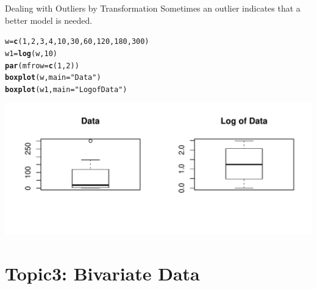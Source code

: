 \documentclass[t,xcolor=pdftex,dvipsnames,table]{beamer}\usepackage[]{graphicx}\usepackage[]{color}
\makeatletter
\def\maxwidth{ %
  \ifdim\Gin@nat@width>\linewidth
    \linewidth
  \else
    \Gin@nat@width
  \fi
}
\newcommand{\hlnum}[1]{\textcolor[rgb]{0.686,0.059,0.569}{#1}}%
\newcommand{\hlstr}[1]{\textcolor[rgb]{0.192,0.494,0.8}{#1}}%
\newcommand{\hlstd}[1]{\textcolor[rgb]{0.345,0.345,0.345}{#1}}%
\newcommand{\hlkwb}[1]{\textcolor[rgb]{0.69,0.353,0.396}{#1}}%
\newcommand{\hlkwc}[1]{\textcolor[rgb]{0.333,0.667,0.333}{#1}}%
\newcommand{\hlkwd}[1]{\textcolor[rgb]{0.737,0.353,0.396}{\textbf{#1}}}%
\newenvironment{kframe}{%
 \def\at@end@of@kframe{}%
 \ifinner\ifhmode%
  \def\at@end@of@kframe{\end{minipage}}%
  \begin{minipage}{\columnwidth}%
 \fi\fi%
 \def\FrameCommand##1{\hskip\@totalleftmargin \hskip-\fboxsep
 \colorbox{shadecolor}{##1}\hskip-\fboxsep
     \hskip-\linewidth \hskip-\@totalleftmargin \hskip\columnwidth}%
 \MakeFramed {\advance\hsize-\width
   \@totalleftmargin\z@ \linewidth\hsize
   \@setminipage}}%
 {\par\unskip\endMakeFramed%
 \at@end@of@kframe}
\newenvironment{knitrout}{}{} %
\makeatother
\begin{document}
\begin{frame}[fragile]{Dealing with Outliers by Transformation}
Sometimes an outlier indicates that a better model is needed.
\begin{knitrout}
\color{fgcolor}\begin{kframe}
\begin{alltt}
\hlstd{w}\hlkwb{=}\hlkwd{c}\hlstd{(}\hlnum{1}\hlstd{,}\hlnum{2}\hlstd{,}\hlnum{3}\hlstd{,}\hlnum{4}\hlstd{,}\hlnum{10}\hlstd{,}\hlnum{30}\hlstd{,}\hlnum{60}\hlstd{,}\hlnum{120}\hlstd{,}\hlnum{180}\hlstd{,}\hlnum{300}\hlstd{)}
\hlstd{w1}\hlkwb{=}\hlkwd{log}\hlstd{(w,}\hlnum{10}\hlstd{)}
\hlkwd{par}\hlstd{(}\hlkwc{mfrow} \hlstd{=} \hlkwd{c}\hlstd{(}\hlnum{1}\hlstd{,} \hlnum{2}\hlstd{))}
\hlkwd{boxplot}\hlstd{(w,} \hlkwc{main} \hlstd{=}\hlstr{"Data"}\hlstd{)}
\hlkwd{boxplot}\hlstd{(w1,} \hlkwc{main}\hlstd{=}\hlstr{"Log of Data"}\hlstd{)}
\end{alltt}
\end{kframe}
\includegraphics[width=\maxwidth]{figure/unnamed-chunk-42-1} 

\end{knitrout}
\end{frame}





\section[3]{Topic3: Bivariate Data}
\end{document}
